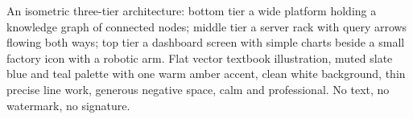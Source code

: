 An isometric three-tier architecture: bottom tier a wide platform holding a knowledge graph of connected nodes; middle tier a server rack with query arrows flowing both ways; top tier a dashboard screen with simple charts beside a small factory icon with a robotic arm. Flat vector textbook illustration, muted slate blue and teal palette with one warm amber accent, clean white background, thin precise line work, generous negative space, calm and professional. No text, no watermark, no signature.
